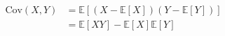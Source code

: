\begin{equation}
    \begin{split}
    \mathrm{Cov}
    \left(
    X,
    Y
    \right)
    &
    =
    \mathbb{E}
    \left[
    \left(
    X
    -
    \mathbb{E}
    \left[
    X
    \right]
    \right)
    \left(
    Y
    -
    \mathbb{E}
    \left[
    Y
    \right]
    \right)
    \right]
    \\
    &
    =
    \mathbb{E}
    \left[
    X
    Y
    \right]
    -
    \mathbb{E}
    \left[
    X
    \right]
    \mathbb{E}
    \left[
    Y
    \right]
    \end{split}
    \label{eq:sigmaMatrix-sigmaxy}
\end{equation}
